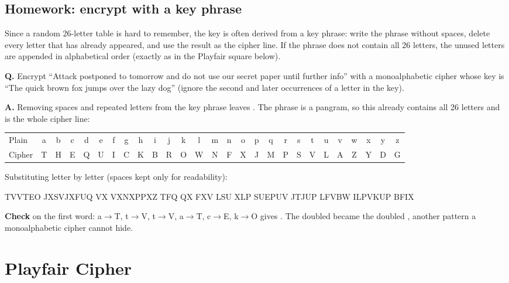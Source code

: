 \subsection{Homework: encrypt with a key phrase}
Since a random 26-letter table is hard to remember, the key is often derived from a key phrase: write the phrase without spaces, delete every letter that has already appeared, and use the result as the cipher line. If the phrase does not contain all 26 letters, the unused letters are appended in alphabetical order (exactly as in the Playfair square below).

\begin{worked}
\textbf{Q.} Encrypt ``Attack postponed to tomorrow and do not use our secret paper until further info'' with a monoalphabetic cipher whose key is ``The quick brown fox jumps over the lazy dog'' (ignore the second and later occurrences of a letter in the key).

\textbf{A.} Removing spaces and repeated letters from the key phrase leaves . The phrase is a pangram, so this already contains all 26 letters and is the whole cipher line:
\begin{center}\small\setlength{\tabcolsep}{2.4pt}
\begin{tabular}{@{}l*{26}{c}@{}}
\toprule
Plain & a&b&c&d&e&f&g&h&i&j&k&l&m&n&o&p&q&r&s&t&u&v&w&x&y&z\\
Cipher & T&H&E&Q&U&I&C&K&B&R&O&W&N&F&X&J&M&P&S&V&L&A&Z&Y&D&G\\
\bottomrule
\end{tabular}
\end{center}
Substituting letter by letter (spaces kept only for readability):
\begin{center}\small\ttfamily
TVVTEO JXSVJXFUQ VX VXNXPPXZ TFQ QX FXV LSU XLP SUEPUV JTJUP LFVBW ILPVKUP BFIX
\end{center}
\textbf{Check} on the first word: a$\to$T, t$\to$V, t$\to$V, a$\to$T, c$\to$E, k$\to$O gives . The doubled  became the doubled , another pattern a monoalphabetic cipher cannot hide.
\end{worked}

\section{Playfair Cipher \hothot}\label{sec:playfair}


